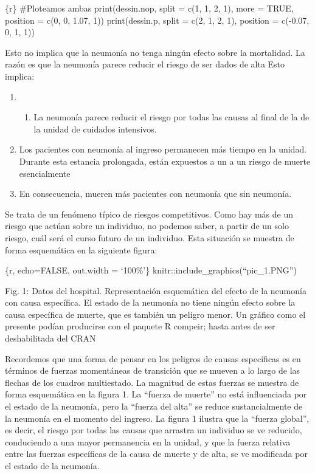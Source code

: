 \documentclass[
]{article}
\providecommand{\tightlist}{%
  \setlength{\itemsep}{0pt}\setlength{\parskip}{0pt}}
\begin{document}
\{r\} \#Ploteamos ambas print(dessin.nop, split = c(1, 1, 2, 1), more =
TRUE, position = c(0, 0, 1.07, 1)) print(dessin.p, split = c(2, 1, 2,
1), position = c(-0.07, 0, 1, 1))

Esto no implica que la neumonía no tenga ningún efecto sobre la
mortalidad. La razón es que la neumonía parece reducir el riesgo de ser
dados de alta Esto implica:

\begin{enumerate}
\def\labelenumi{\arabic{enumi}.}
\item
  \begin{enumerate}
  \def\labelenumii{\arabic{enumii}.}
  \tightlist
  \item
    La neumonía parece reducir el riesgo por todas las causas al final
    de la de la unidad de cuidados intensivos.
  \end{enumerate}
\item
  Los pacientes con neumonía al ingreso permanecen más tiempo en la
  unidad. Durante esta estancia prolongada, están expuestos a un a un
  riesgo de muerte esencialmente
\item
  En consecuencia, mueren más pacientes con neumonía que sin neumonía.
\end{enumerate}

Se trata de un fenómeno típico de riesgos competitivos. Como hay más de
un riesgo que actúan sobre un individuo, no podemos saber, a partir de
un solo riesgo, cuál será el curso futuro de un individuo. Esta
situación se muestra de forma esquemática en la siguiente figura:

\{r, echo=FALSE, out.width = `100\%'\}
knitr::include\_graphics(``pic\_1.PNG'')

Fig. 1: Datos del hospital. Representación esquemática del efecto de la
neumonía con causa específica. El estado de la neumonía no tiene ningún
efecto sobre la causa específica de muerte, que es también un peligro
menor. Un gráfico como el presente podían producirse con el paquete R
compeir; hasta antes de ser deshabilitada del CRAN

Recordemos que una forma de pensar en los peligros de causas específicas
es en términos de fuerzas momentáneas de transición que se mueven a lo
largo de las flechas de los cuadros multiestado. La magnitud de estas
fuerzas se muestra de forma esquemática en la figura 1. La ``fuerza de
muerte'' no está influenciada por el estado de la neumonía, pero la
``fuerza del alta'' se reduce sustancialmente de la neumonía en el
momento del ingreso. La figura 1 ilustra que la ``fuerza global'', es
decir, el riesgo por todas las causas que arrastra un individuo se ve
reducido, conduciendo a una mayor permanencia en la unidad, y que la
fuerza relativa entre las fuerzas específicas de la causa de muerte y de
alta, se ve modificada por el estado de la neumonía.
\end{document}
